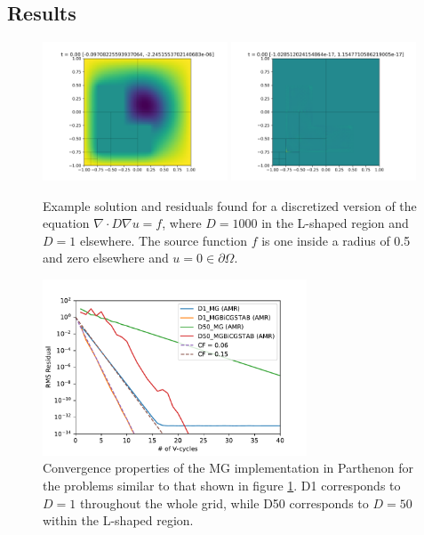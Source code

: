 \documentclass{article}
\begin{document}
\subsection{Results}

\begin{figure}[!htb]
    \centering
    \includegraphics[width=0.49\textwidth]{x.png}
    \includegraphics[width=0.49\textwidth]{r.png}
    \caption{Example solution and residuals found for a discretized version of the equation $\nabla \cdot D \nabla u = f$, where $D=1000$ in the L-shaped region and $D=1$ elsewhere. The source function $f$ is one inside a radius of 0.5 and zero elsewhere and $u=0 \in \partial \Omega$.}
    \label{fig:solution}
\end{figure}

\begin{figure}[!htb]
    \centering
    \includegraphics[width=0.7\textwidth]{convergence.pdf}
    \caption{Convergence properties of the MG implementation in Parthenon for the problems similar to that shown in figure \ref{fig:solution}. D1 corresponds to $D=1$ throughout the whole grid, while D50 corresponds to $D=50$ within the L-shaped region.}
    \label{fig:convergence}
\end{figure}



\end{document}

